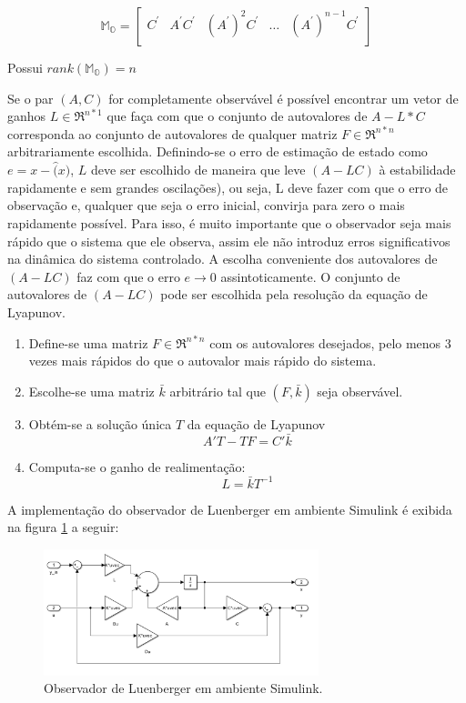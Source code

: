 \begin{equation}\label{eq:Matrix:MO}
    \mathbb{M_O}=
    \begin{bmatrix}
        C^'&A^'C^'&(A^')^2C^'&\dots&(A^')^{n-1}C^'\\
    \end{bmatrix}        
\end{equation}

Possui $rank(\mathbb{M_O}) = n$
 
Se o par $(A,C)$ for completamente observável é possível encontrar um vetor de ganhos $L\in \Re^{n*1}$ que faça com que o conjunto de autovalores de $A-L*C$ corresponda ao conjunto de autovalores de qualquer matriz $F \in \Re^{n*n}$ arbitrariamente escolhida. 
Definindo-se o erro de estimação de estado como $e=x-\hat(x)$, $L$ deve ser escolhido de maneira que leve $(A-LC)$ à estabilidade rapidamente e sem grandes oscilações), ou seja, L deve fazer com que o erro de observação e,
qualquer que seja o erro inicial, convirja para zero o mais rapidamente possível. Para isso, é muito importante que o observador seja mais rápido 
que o sistema que ele observa, assim ele não introduz erros significativos na dinâmica do sistema controlado. A escolha conveniente dos autovalores de $(A-LC)$ faz com que o erro $e\rightarrow0$ assintoticamente. 
O conjunto de autovalores de $(A-LC)$ pode ser escolhida pela resolução da equação de Lyapunov.
    
\begin{enumerate}
    \item Define-se uma matriz $F \in \Re^{n*n}$ com os autovalores desejados, pelo menos 3 vezes mais rápidos do que o autovalor mais rápido do sistema.
    \item Escolhe-se uma matriz $\bar{k}$ arbitrário tal que $(F,\bar{k})$ seja observável.
    \item {Obtém-se a solução única $T$ da equação de Lyapunov
    \begin{equation} \label{eq:lyapunov}
            A'T-TF=C'\bar{k}
    \end{equation}}
    \item {Computa-se o ganho de realimentação:
    \begin{equation} \label{eq:ganho}
            L=\bar{k}T^{-1}
    \end{equation}}
\end{enumerate}  

A implementação do observador de Luenberger em ambiente Simulink é exibida na figura \ref{fig:luemberger_simulink} a seguir:

\FloatBarrier
\begin{figure}[htbp]
    \begin{centering}
        \includegraphics[width=8cm]{img/luenberger_simulink.png}
        \caption{Observador de Luenberger em ambiente Simulink.} 
        \label{fig:luemberger_simulink}
    \end{centering}
\end{figure}
\FloatBarrier